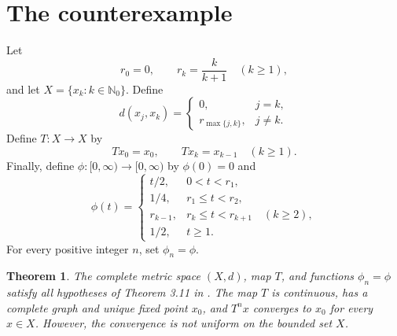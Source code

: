 \documentclass[11pt]{article}
\newtheorem{theorem}{Theorem}
\newcommand{\N}{\mathbb{N}}
\begin{document}
\section{The counterexample}

Let
\[
 r_0=0,\qquad r_k=\frac{k}{k+1}\quad(k\geq1),
\]
and let $X=\{x_k:k\in\N_0\}$.  Define
\[
 d(x_j,x_k)=
 \begin{cases}
 0,&j=k,\\
 r_{\max\{j,k\}},&j\ne k.
 \end{cases}
\]
Define $T:X\to X$ by
\[
 Tx_0=x_0,\qquad Tx_k=x_{k-1}\quad(k\geq1).
\]
Finally, define $\phi:[0,\infty)\to[0,\infty)$ by $\phi(0)=0$ and
\[
 \phi(t)=
 \begin{cases}
 t/2,&0<t<r_1,\\
 1/4,&r_1\leq t<r_2,\\
 r_{k-1},&r_k\leq t<r_{k+1}\quad(k\geq2),\\
 1/2,&t\geq1.
 \end{cases}
\]
For every positive integer $n$, set $\phi_n=\phi$.

\begin{theorem}
The complete metric space $(X,d)$, map $T$, and functions $\phi_n=\phi$
satisfy all hypotheses of Theorem 3.11 in \cite{khandani}.  The map $T$ is
continuous, has a complete graph and unique fixed point $x_0$, and $T^n x$
converges to $x_0$ for every $x\in X$.  However, the convergence is not
uniform on the bounded set $X$.
\end{theorem}
\end{document}
